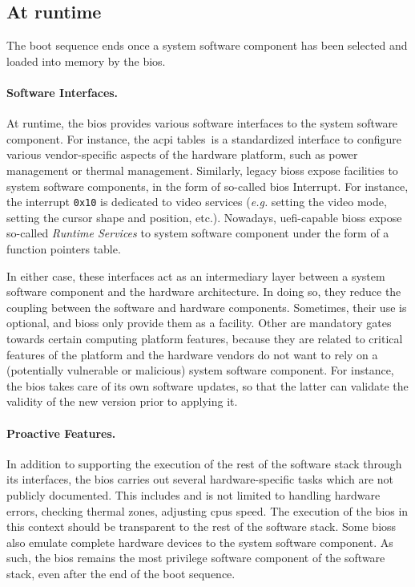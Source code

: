 \subsection{At runtime}
\label{subsec:usecase:firm:runtime}

The boot sequence ends once a system software component has been selected and
loaded into memory by the \ac{bios}.

\paragraph{Software Interfaces.}
At runtime, the \ac{bios} provides various software interfaces to the system
software component.
%
For instance, the \ac{acpi} tables\,\cite{uefi2017acpi,duflot2010acpi} is a
standardized interface to configure various vendor-specific aspects of
the hardware platform, such as power management or thermal management.
%
Similarly, legacy \acp{bios} expose facilities to system software
components, in the form of so-called \ac{bios} Interrupt.
%
For instance, the interrupt \texttt{0x10} is dedicated to video services
(\emph{e.g.} setting the video mode, setting the cursor shape and position,
etc.).
%
Nowadays, \ac{uefi}-capable \acp{bios} expose so-called \emph{Runtime Services}
to system software component\cite[Chapter 5]{zimmer2017uefi} under the form of a
function pointers table.

In either case, these interfaces act as an intermediary layer between a system
software component and the hardware architecture.
%
In doing so, they reduce the coupling between the software and hardware
components.
%
Sometimes, their use is optional, and \acp{bios} only provide them as a facility.
%
Other are mandatory gates towards certain computing platform features, because
they are related to critical features of the platform and the hardware vendors
do not want to rely on a (potentially vulnerable or malicious) system software
component.
%
For instance, the \ac{bios} takes care of its own software updates, so that the latter can validate the validity of the new
version prior to applying it.

\paragraph{Proactive Features.}
%
In addition to supporting the execution of the rest of the software stack
through its interfaces, the \ac{bios} carries out several hardware-specific
tasks which are not publicly documented.
%
This includes and is not limited to handling hardware errors, checking thermal
zones, adjusting \acp{cpu} speed.
%
The execution of the \ac{bios} in this context should be transparent to
the rest of the software stack.
%
Some \acp{bios} also emulate complete hardware devices to the system software
component.
%
As such, the \ac{bios} remains the most privilege software component of the
software stack, even after the end of the boot sequence.

